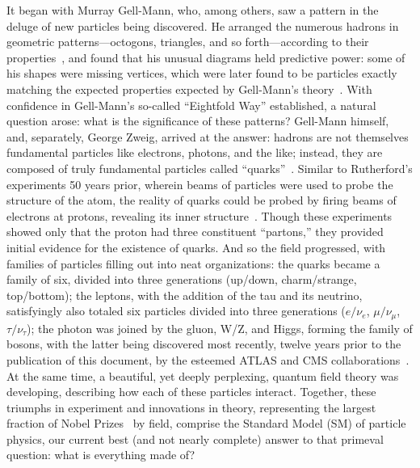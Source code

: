 \begin{dissertationintroduction}
It began with Murray Gell-Mann, who, among others, saw a pattern in the deluge of new particles being discovered. 
He arranged the numerous hadrons in geometric patterns---octogons, triangles, and so forth---according to their properties~\cite{Gell-Mann:1961omu}, and found that his unusual diagrams held predictive power: some of his shapes were missing vertices, which were later found to be particles exactly matching the expected properties expected by Gell-Mann's theory~\cite{PhysRevLett.12.204}. 
With confidence in Gell-Mann's so-called ``Eightfold Way'' established, a natural question arose: what is the significance of these patterns? 
Gell-Mann himself, and, separately, George Zweig, arrived at the answer: hadrons are not themselves fundamental particles like electrons, photons, and the like; instead, they are composed of truly fundamental particles called ``quarks''~\cite{Lichtenberg:784713}.
Similar to Rutherford's experiments 50 years prior, wherein beams of particles were used to probe the structure of the atom, the reality of quarks could be probed by firing beams of electrons at protons, revealing its inner structure~\cite{PhysRevLett.23.930, PhysRevLett.23.935}. 
Though these experiments showed only that the proton had three constituent ``partons,'' they provided initial evidence for the existence of quarks.
And so the field progressed, with families of particles filling out into neat organizations: 
the quarks became a family of six, divided into three generations (up/down, charm/strange, top/bottom); %
the leptons, with the addition of the tau and its neutrino, satisfyingly also totaled six particles divided into three generations ($e/\nu_e$, $\mu/\nu_\mu$, $\tau/\nu_\tau$); %
the photon was joined by the gluon, W/Z, and Higgs, forming the family of bosons, with the latter being discovered most recently, twelve years prior to the publication of this document, by the esteemed ATLAS and CMS collaborations~\cite{ATLASdisc, CMSdisc}. %
At the same time, a beautiful, yet deeply perplexing, quantum field theory was developing, describing how each of these particles interact. 
Together, these triumphs in experiment and innovations in theory, representing the largest fraction of Nobel Prizes~\cite{ParticleNobels} by field, comprise the Standard Model (SM) of particle physics, our current best (and not nearly complete) answer to that primeval question: what is everything made of? 


\end{dissertationintroduction}
